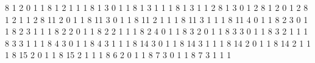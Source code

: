    {8}  {1} {2} {0} {1} {1}   %
   {8}  {1} {2} {1} {1} {1}   %
  {8}  {1} {3} {0} {1} {1}   %
  {8}  {1} {3} {1} {1} {1}   %
  {8}  {1} {3} {1} {1} {2}   %
  {8}  {1} {3} {0} {1} {2}   %
  {8}  {1} {2} {0} {1} {2}   %
  {8}  {1} {2} {1} {1} {2}   %
   {8} {11} {2} {0} {1} {1}   %
   {8} {11} {3} {0} {1} {1}   %
   {8} {11} {2} {1} {1} {1}   %
   {8} {11} {3} {1} {1} {1}   %
   {8} {11} {4} {0} {1} {1}   %
    {8}  {2} {3} {0} {1} {1}   %
   {8}  {2} {3} {1} {1} {1}   %
  {8}  {2} {2} {0} {1} {1}   %
   {8}  {2} {2} {1} {1} {1}   %
   {8}  {2} {4} {0} {1} {1}   %
   {8}  {3} {2} {0} {1} {1}   %
   {8}  {3} {3} {0} {1} {1}   %
   {8}  {3} {2} {1} {1} {1}   %
   {8}  {3} {3} {1} {1} {1}   %
   {8}  {4} {3} {0} {1} {1}   %
   {8}  {4} {3} {1} {1} {1}   %
   {8} {14} {3} {0} {1} {1}   %
   {8} {14} {3} {1} {1} {1}   %
   {8} {14} {2} {0} {1} {1}   %
   {8} {14} {2} {1} {1} {1}   %
   {8} {15} {2} {0} {1} {1}   %
   {8} {15} {2} {1} {1} {1}   %
  {8}  {6} {2} {0} {1} {1}   %
   {8}  {7} {3} {0} {1} {1}   %
   {8}  {7} {3} {1} {1} {1}   %

